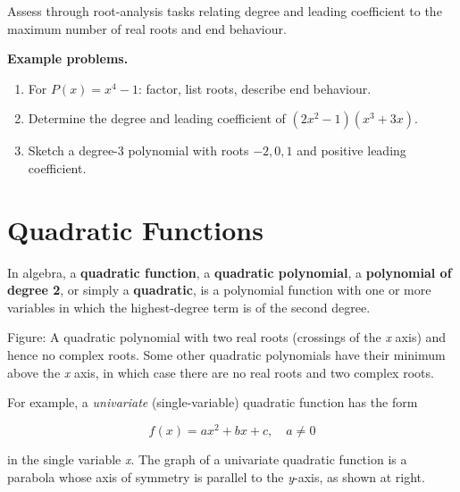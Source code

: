 Assess through root-analysis tasks relating degree and leading coefficient
to the maximum number of real roots and end behaviour.

\textbf{Example problems.}
\begin{enumerate}
    \item For $P(x)=x^4-1$: factor, list roots, describe end behaviour.
    \item Determine the degree and leading coefficient of
          $(2x^2-1)(x^3+3x)$.
    \item Sketch a degree-3 polynomial with roots $-2, 0, 1$ and positive
          leading coefficient.
\end{enumerate}



\section{Quadratic Functions}
\label{sec:quad-e70d}


In algebra, a \textbf{quadratic function}, a \textbf{quadratic polynomial}, a
\textbf{polynomial of degree 2}, or simply a \textbf{quadratic}, is a polynomial function
with one or more variables in which the highest-degree term is of the second degree.






Figure: A quadratic polynomial with two real roots (crossings of the \textit{x} axis) and
hence no complex roots. Some other quadratic polynomials have their minimum above the
\textit{x} axis, in which case there are no real roots and two complex roots.



For example, a \textit{univariate} (single-variable) quadratic function has the form



$$f(x)=ax^2+bx+c,\quad a \ne 0$$

in the single variable \textit{x}. The graph of a univariate quadratic function is a
parabola whose axis of symmetry is parallel to the \textit{y}-axis, as shown at right.



